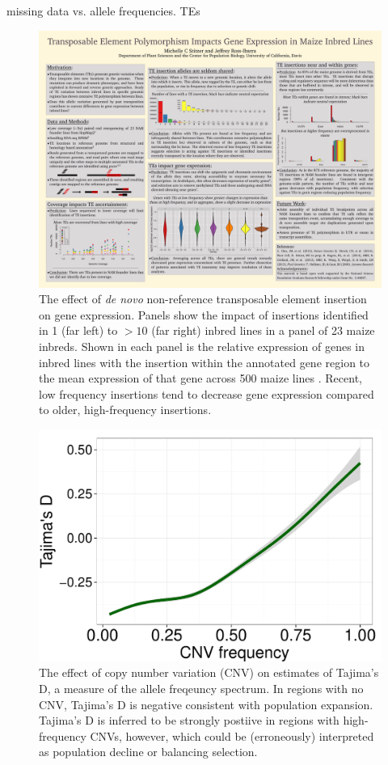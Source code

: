 \documentclass[11pt]{article}
\begin{document}
missing data vs. allele frequencies.
TEs
\begin{figure}[tb]
\includegraphics[width=0.45\linewidth]{figs/te_expression.pdf}
\caption{The effect of \emph{de novo} non-reference transposable element insertion on gene expression. Panels show the impact of insertions identified in 1 (far left) to $>10$ (far right) inbred lines in a panel of 23 maize inbreds.  Shown in each panel is the relative expression of genes in inbred lines with the insertion within the annotated gene region to the mean expression of that gene across 500 maize lines \citep{hirsch2014insights}. Recent, low frequency insertions tend to decrease gene expression compared to older, high-frequency insertions.  } 
\label{fig:te_expression}
\end{figure}

\begin{figure}
\includegraphics[width=0.45\linewidth]{figs/td_cnv.pdf}
\caption{The effect of copy number variation (CNV) on estimates of Tajima's D, a measure of the allele freqeuncy spectrum. In regions with no CNV, Tajima's D is negative consistent with population expansion. Tajima's D is inferred to be strongly postiive in regions with high-frequency CNVs, however, which could be (erroneously) interpreted as population decline or balancing selection.} 
\label{fig:tajd}
\end{figure}
%
\end{document}
